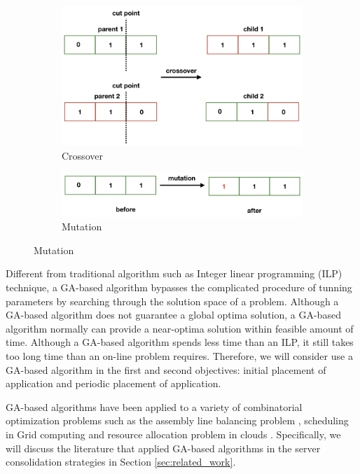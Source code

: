 \begin{figure}
	\centering
	\begin{subfigure}[b]{0.44\textwidth}
		\includegraphics[width=\textwidth]{pics/crossover.png}
	\caption{Crossover}
	\end{subfigure}
	\begin{subfigure}[b]{0.44\textwidth}
		\includegraphics[width=\textwidth]{pics/mutation.png}
	\caption{Mutation}
	\end{subfigure}
	\label{fig:operators}
\end{figure}

 Different from traditional algorithm such as Integer linear programming (ILP) technique, a GA-based algorithm bypasses the complicated procedure of tunning parameters by searching through the solution space of a problem. Although a GA-based algorithm does not guarantee a global optima solution, a GA-based algorithm normally can provide a near-optima solution within feasible amount of time. Although a GA-based algorithm spends less time than an ILP, it still takes too long time than an on-line problem requires. Therefore, we will consider use a GA-based algorithm in the first and second objectives: initial placement of application and periodic placement of application. 

GA-based algorithms have been applied to a variety of combinatorial optimization problems such as the assembly line balancing problem \cite{Anderson:1994io}, scheduling in Grid computing \cite{Zomaya:2005bb} and resource allocation problem in clouds \cite{Wilcox:2011ea}. Specifically, we will discuss the literature that applied GA-based algorithms in the server consolidation strategies in Section \ref{sec:related_work}. 

